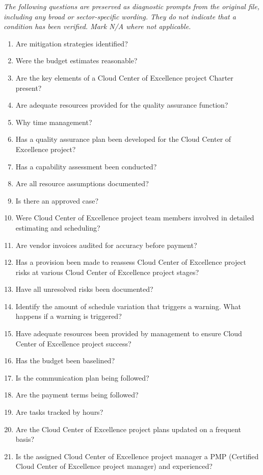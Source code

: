 \documentclass[10pt,letterpaper]{article}
\newcommand{\docsection}[1]{\par\Needspace{5\baselineskip}\vspace{8pt}{\large\sffamily\bfseries\color{navy}#1}\par\vspace{2pt}{\color{rulegrey}\rule{\linewidth}{.6pt}}\par}
\begin{document}
\docsection{03 \quad Source diagnostic checklist}
\textit{The following questions are preserved as diagnostic prompts from the original file, including any broad or sector-specific wording. They do not indicate that a condition has been verified. Mark N/A where not applicable.}
\begingroup\small\begin{enumerate}[leftmargin=2.1em, itemsep=4pt]
\item[1.] Are mitigation strategies identified?
\item[2.] Were the budget estimates reasonable?
\item[3.] Are the key elements of a Cloud Center of Excellence project Charter present?
\item[4.] Are adequate resources provided for the quality assurance function?
\item[5.] Why time management?
\item[6.] Has a quality assurance plan been developed for the Cloud Center of Excellence project?
\item[7.] Has a capability assessment been conducted?
\item[8.] Are all resource assumptions documented?
\item[9.] Is there an approved case?
\item[10.] Were Cloud Center of Excellence project team members involved in detailed estimating and scheduling?
\item[11.] Are vendor invoices audited for accuracy before payment?
\item[12.] Has a provision been made to reassess Cloud Center of Excellence project risks at various Cloud Center of Excellence project stages?
\item[13.] Have all unresolved risks been documented?
\item[14.] Identify the amount of schedule variation that triggers a warning. What happens if a warning is triggered?
\item[15.] Have adequate resources been provided by management to ensure Cloud Center of Excellence project success?
\item[16.] Has the budget been baselined?
\item[17.] Is the communication plan being followed?
\item[18.] Are the payment terms being followed?
\item[19.] Are tasks tracked by hours?
\item[20.] Are the Cloud Center of Excellence project plans updated on a frequent basis?
\item[21.] Is the assigned Cloud Center of Excellence project manager a PMP (Certified Cloud Center of Excellence project manager) and experienced?
\end{enumerate}\endgroup
\end{document}
